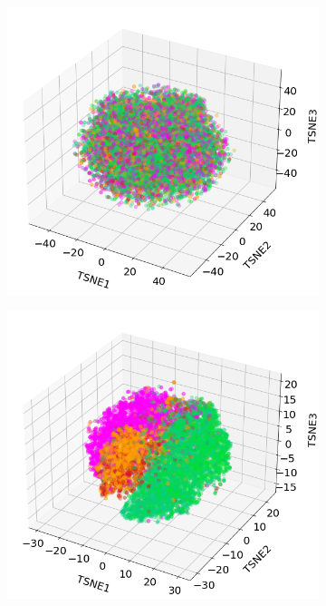 \documentclass[journal,article,submit,pdftex,moreauthors]{Definitions/mdpi}
\begin{document}
\begin{figure}[H]
	\centering
	\begin{subfigure}[t]{0.35\linewidth}
		\centering
		\includegraphics[width=0.9\linewidth]{figures/aes_1_layer_mse_results/s2_TSNE_v3.png}
		\caption{}
	  \label{fig:pca_raw}
	\end{subfigure}
	\begin{subfigure}[t]{0.35\linewidth}
		\centering
		\includegraphics[width=0.9\linewidth]{figures/aes_1_layer_mse_results/representations_TSNE_v5.png}
	\caption{}
	\label{fig:pca_rep}

\end{subfigure}
\end{figure}
\end{document}
